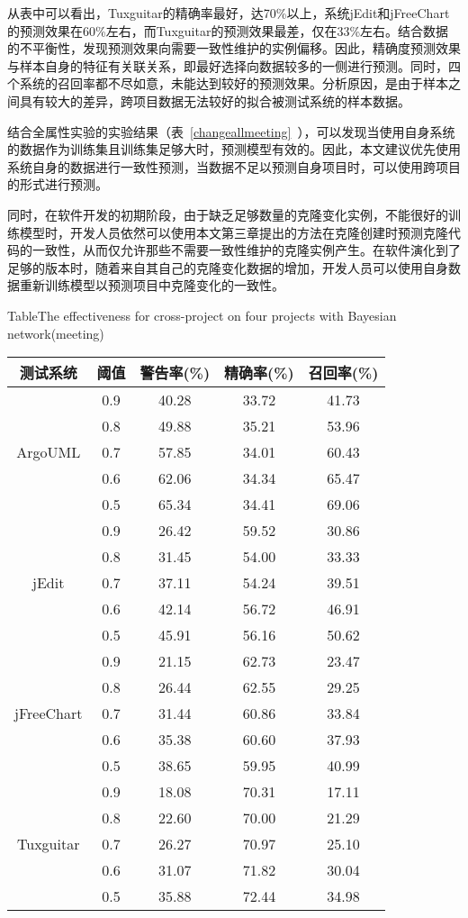 从表中可以看出，Tuxguitar的精确率最好，达70\%以上，系统jEdit和jFreeChart的预测效果在60\%左右，而Tuxguitar的预测效果最差，仅在33\%左右。结合数据的不平衡性，发现预测效果向需要一致性维护的实例偏移。因此，精确度预测效果与样本自身的特征有关联关系，即最好选择向数据较多的一侧进行预测。同时，四个系统的召回率都不尽如意，未能达到较好的预测效果。分析原因，是由于样本之间具有较大的差异，跨项目数据无法较好的拟合被测试系统的样本数据。

结合全属性实验的实验结果（表~\ref{changeallmeeting}~），可以发现当使用自身系统的数据作为训练集且训练集足够大时，预测模型有效的。因此，本文建议优先使用系统自身的数据进行一致性预测，当数据不足以预测自身项目时，可以使用跨项目的形式进行预测。

同时，在软件开发的初期阶段，由于缺乏足够数量的克隆变化实例，不能很好的训练模型时，开发人员依然可以使用本文第三章提出的方法在克隆创建时预测克隆代码的一致性，从而仅允许那些不需要一致性维护的克隆实例产生。在软件演化到了足够的版本时，随着来自其自己的克隆变化数据的增加，开发人员可以使用自身数据重新训练模型以预测项目中克隆变化的一致性。

\begin{table}[htbp]
{Table$\!$}{The effectiveness for cross-project on four projects with Bayesian network(meeting)}
\vspace{0.5em}
\centering
\wuhao
\begin{tabular}{ccccc}
\toprule[1.5pt]
{测试系统}&{阈值}&{警告率(\%)}&{精确率(\%)}&{召回率(\%)}\\
\midrule[1pt]
\multirow{5}{*}{ArgoUML}
&0.9&	40.28&	33.72&	41.73\\
&0.8&	49.88&	35.21&	53.96\\
&0.7&	57.85&	34.01&	60.43\\
&0.6&	62.06&	34.34&	65.47\\
&0.5&	65.34&	34.41&	69.06\\
\hline
\multirow{5}{*}{jEdit}
&0.9&	26.42&	59.52&	30.86\\
&0.8&	31.45&	54.00&	33.33\\
&0.7&	37.11&	54.24&	39.51\\
&0.6&	42.14&	56.72&	46.91\\
&0.5&	45.91&	56.16&	50.62\\
\hline
\multirow{5}{*}{jFreeChart}
&0.9&	21.15&	62.73&	23.47\\
&0.8&	26.44&	62.55&	29.25\\
&0.7&	31.44&	60.86&	33.84\\
&0.6&	35.38&	60.60&	37.93\\
&0.5&	38.65&	59.95&	40.99\\
\hline
\multirow{5}{*}{Tuxguitar}
&0.9&	18.08&	70.31&	17.11\\
&0.8&	22.60&	70.00&	21.29\\
&0.7&	26.27&	70.97&	25.10\\
&0.6&	31.07&	71.82&	30.04\\
&0.5&	35.88&	72.44&	34.98\\
\bottomrule[1.5pt]
\end{tabular}
\end{table}

